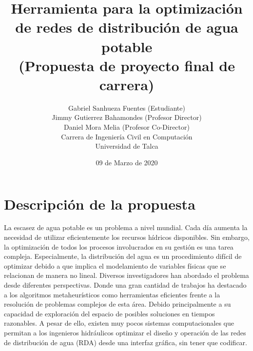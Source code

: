 \documentclass[11pt,letterpaper]{article}
\begin{document}
\pagestyle{empty}

\title{
Herramienta para la optimización de redes de distribución de agua potable\\
(Propuesta de proyecto final de carrera)
}
\author{
Gabriel Sanhueza Fuentes (Estudiante)\\
Jimmy Gutierrez Bahamondes (Profesor Director)\\
Daniel Mora Melia (Profesor Co-Director)\\
Carrera de Ingeniería Civil en Computación\\ 
Universidad de Talca}
\date{09 de Marzo de 2020}

\maketitle


\section{Descripción de la propuesta}


La escasez de agua potable es un problema a nivel mundial. Cada día aumenta la necesidad de utilizar eficientemente los recursos hídricos disponibles. Sin embargo, la optimización de todos los procesos involucrados en su gestión es una tarea compleja. Especialmente, la distribución del agua es un procedimiento difícil de optimizar debido a que implica el modelamiento de variables físicas que se relacionan de manera no lineal. Diversos investigadores han abordado el problema desde diferentes perspectivas. Donde una gran cantidad de trabajos ha destacado a los algoritmos metaheurísticos como herramientas eficientes frente a la resolución de problemas complejos de esta área. Debido principalmente a su capacidad de exploración del espacio de posibles soluciones en tiempos razonables. A pesar de ello, existen muy pocos sistemas computacionales que permitan a los ingenieros hidráulicos optimizar el diseño y operación de las redes de distribución de agua (RDA) desde una interfaz gráfica, sin tener que codificar.  
\end{document}
